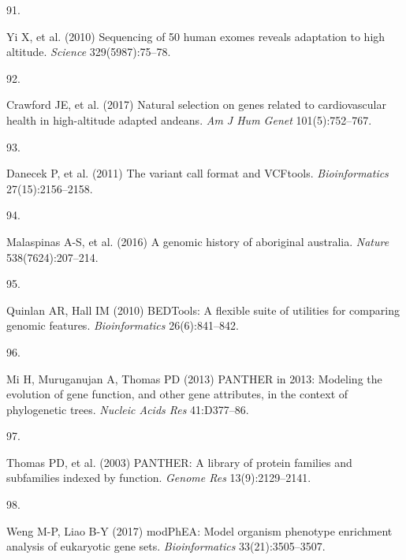 \documentclass[9pt,twocolumn,twoside,lineno]{pnas-new}
\newlength{\cslhangindent}
\newlength{\csllabelwidth}
\newlength{\cslentryspacingunit} %
\newenvironment{CSLReferences}[2] %
 {%
  \setlength{\parindent}{0pt}
  \ifodd #1
  \let\oldpar\par
  \def\par{\hangindent=\cslhangindent\oldpar}
  \fi
  \setlength{\parskip}{#2\cslentryspacingunit}
 }%
 {}
\newcommand{\CSLLeftMargin}[1]{\parbox[t]{\csllabelwidth}{#1}}
\newcommand{\CSLRightInline}[1]{\parbox[t]{\linewidth - \csllabelwidth}{#1}\break}
\begin{document}
\begin{CSLReferences}{0}{0}
\leavevmode\hypertarget{ref-Yi2010}{}%
\CSLLeftMargin{91. }
\CSLRightInline{Yi X, et al. (2010) Sequencing of 50 human exomes
reveals adaptation to high altitude. \emph{Science} 329(5987):75--78.}

\leavevmode\hypertarget{ref-Crawford2017}{}%
\CSLLeftMargin{92. }
\CSLRightInline{Crawford JE, et al. (2017) Natural selection on genes
related to cardiovascular health in {high-altitude} adapted andeans.
\emph{Am J Hum Genet} 101(5):752--767.}

\leavevmode\hypertarget{ref-Danecek2011}{}%
\CSLLeftMargin{93. }
\CSLRightInline{Danecek P, et al. (2011) The variant call format and
{VCFtools}. \emph{Bioinformatics} 27(15):2156--2158.}

\leavevmode\hypertarget{ref-Malaspinas2016}{}%
\CSLLeftMargin{94. }
\CSLRightInline{Malaspinas A-S, et al. (2016) A genomic history of
aboriginal australia. \emph{Nature} 538(7624):207--214.}

\leavevmode\hypertarget{ref-Quinlan2010}{}%
\CSLLeftMargin{95. }
\CSLRightInline{Quinlan AR, Hall IM (2010) {BEDTools}: A flexible suite
of utilities for comparing genomic features. \emph{Bioinformatics}
26(6):841--842.}

\leavevmode\hypertarget{ref-Mi2013}{}%
\CSLLeftMargin{96. }
\CSLRightInline{Mi H, Muruganujan A, Thomas PD (2013) PANTHER in 2013:
Modeling the evolution of gene function, and other gene attributes, in
the context of phylogenetic trees. \emph{Nucleic Acids Res}
41:D377--86.}

\leavevmode\hypertarget{ref-Thomas2003}{}%
\CSLLeftMargin{97. }
\CSLRightInline{Thomas PD, et al. (2003) {PANTHER}: A library of protein
families and subfamilies indexed by function. \emph{Genome Res}
13(9):2129--2141.}

\leavevmode\hypertarget{ref-Weng2017}{}%
\CSLLeftMargin{98. }
\CSLRightInline{Weng M-P, Liao B-Y (2017) {modPhEA}: Model organism
phenotype enrichment analysis of eukaryotic gene sets.
\emph{Bioinformatics} 33(21):3505--3507.}

\end{CSLReferences}



% 
\end{document}
